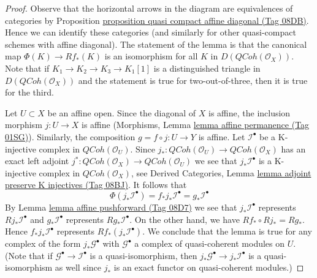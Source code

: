 \documentclass{amsart}
\theoremstyle{plain}
\theoremstyle{definition}
\theoremstyle{remark}
\numberwithin{equation}{subsection}
\def\QCoh{\mathit{QCoh}}
\begin{document}
\begin{proof}
Observe that the horizontal arrows in the diagram are
equivalences of categories by
Proposition \href{https://stacks.math.columbia.edu/tag/08DB}{proposition quasi compact affine diagonal (Tag 08DB)}.
Hence we can identify these categories (and similarly for
other quasi-compact schemes with affine diagonal).
The statement of the lemma is that the canonical map
$\Phi(K) \to Rf_*(K)$ is an isomorphism for all $K$ in
$D(\QCoh(\mathcal{O}_X))$. Note that if $K_1 \to K_2 \to K_3 \to K_1[1]$
is a distinguished triangle in $D(\QCoh(\mathcal{O}_X))$ and
the statement is true for two-out-of-three, then it is true
for the third.

\medskip\noindent
Let $U \subset X$ be an affine open. Since the diagonal of $X$ is affine,
the inclusion morphism $j : U \to X$
is affine (Morphisms, Lemma \href{https://stacks.math.columbia.edu/tag/01SG}{lemma affine permanence (Tag 01SG)}).
Similarly, the composition $g = f \circ j : U \to Y$ is affine.
Let $\mathcal{I}^\bullet$ be a K-injective complex in $\QCoh(\mathcal{O}_U)$.
Since $j_* : \QCoh(\mathcal{O}_U) \to \QCoh(\mathcal{O}_X)$
has an exact left adjoint
$j^* : \QCoh(\mathcal{O}_X) \to \QCoh(\mathcal{O}_U)$
we see that $j_*\mathcal{I}^\bullet$ is a K-injective complex
in $\QCoh(\mathcal{O}_X)$, see
Derived Categories, Lemma \href{https://stacks.math.columbia.edu/tag/08BJ}{lemma adjoint preserve K injectives (Tag 08BJ)}.
It follows that
$$
\Phi(j_*\mathcal{I}^\bullet) =
f_*j_*\mathcal{I}^\bullet =
g_*\mathcal{I}^\bullet
$$
By Lemma \href{https://stacks.math.columbia.edu/tag/08D7}{lemma affine pushforward (Tag 08D7)} we see that
$j_*\mathcal{I}^\bullet$ represents $Rj_*\mathcal{I}^\bullet$ and
$g_*\mathcal{I}^\bullet$ represents $Rg_*\mathcal{I}^\bullet$.
On the other hand, we have $Rf_* \circ Rj_* = Rg_*$.
Hence $f_*j_*\mathcal{I}^\bullet$ represents $Rf_*(j_*\mathcal{I}^\bullet)$.
We conclude that the lemma is true for any complex
of the form $j_*\mathcal{G}^\bullet$ with $\mathcal{G}^\bullet$
a complex of quasi-coherent modules on $U$. (Note that if
$\mathcal{G}^\bullet \to \mathcal{I}^\bullet$ is a quasi-isomorphism,
then $j_*\mathcal{G}^\bullet \to j_*\mathcal{I}^\bullet$ is a
quasi-isomorphism as well since $j_*$ is an exact functor
on quasi-coherent modules.)


\end{proof}
\end{document}
